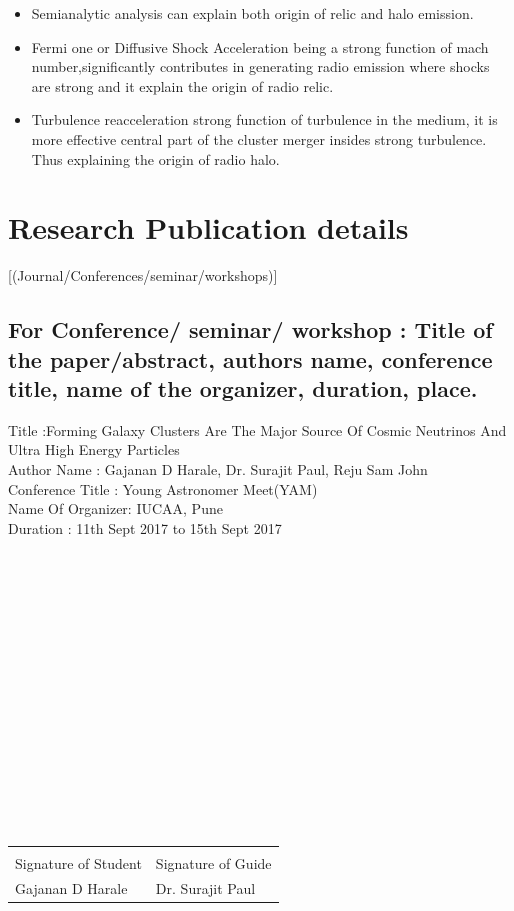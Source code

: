 \documentclass[10pt]{article}
\begin{document}
\begin{itemize}
\item Semianalytic analysis can explain both origin of relic and halo emission.
\item Fermi one or Diffusive Shock Acceleration being a strong function of mach number,significantly contributes in generating radio emission where shocks are strong and it explain the origin of radio relic.
\item Turbulence reacceleration strong function of turbulence in the medium, it is more effective central part of the cluster merger insides strong turbulence. Thus explaining the origin of radio halo.
\end{itemize}
\section{Research Publication details}[(Journal/Conferences/seminar/workshops)]
\subsection{For Conference/ seminar/ workshop : Title of the paper/abstract, authors name,
conference title, name of the organizer, duration, place.}
Title    :Forming Galaxy Clusters Are The Major Source Of Cosmic Neutrinos And Ultra
High Energy Particles\\
Author Name      : Gajanan D Harale, Dr. Surajit Paul, Reju Sam John\\
Conference Title : Young Astronomer Meet(YAM)\\
Name Of Organizer: IUCAA, Pune\\
Duration         : 11th Sept 2017 to 15th Sept 2017
\\ \\ \\ \\ \\ \\ \\ \\
\\ \\
\\ \\
\\ \\ 
\\ \\ 
\noindent\begin{tabular}{@{}p{3.5in}p{3.5in}@{}}
\dotfill                       & \dotfill\\
Signature of Student           & Signature of Guide\\
Gajanan D Harale               &  Dr. Surajit Paul
                                                           
\end{tabular} 
\end{document}
